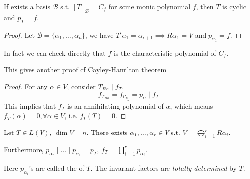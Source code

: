 \begin{proposition}
	If exists a basis $\mathcal{B}$ s.t. $[T]_{\mathcal{B}} = C_f$ for some
	monic polynomial $f$, then $T$ is cyclic and $p_T = f$.
\end{proposition}
\begin{proof}[Proof]
    Let $\mathcal{B} = \{\alpha_1,\dots,\alpha_n\}$,
	we have $T^i \alpha_1 = \alpha_{i + 1} \implies R\alpha_1 = V$ and
	$p_{\alpha_1} = f$.
\end{proof}

\begin{remark}
    In fact we can check directly that $f$ is the
	characteristic polynomial of $C_f$.

	This gives another proof of Cayley-Hamilton theorem: 
	\begin{proof}[Proof]
	    For any $\alpha\in V$, consider $T_{R\alpha} \mid f_T$.
		\[
		f_{T_{R\alpha}} = f_{C_{p_\alpha}} = p_\alpha \mid f_T
		\]
		This implies that $f_T$ is an annihilating polynomial of $\alpha$,
		which means $f_T(\alpha) = 0, \forall \alpha\in V$,
		i.e. $f_T(T) = 0$.
	\end{proof}
\end{remark}

\begin{theorem}
    Let $T\in L(V)$, $\dim V = n$. There exists $\alpha_1,\dots,\alpha_r\in V$
	s.t. $V = \bigoplus_{i=1}^r R\alpha_i$.

	Furthermore, $p_{\alpha_r}\mid\dots\mid p_{\alpha_1} = p_T$,
	$f_T = \prod_{i=1}^r p_{\alpha_i}$.

	Here $p_{\alpha_i}$'s are called the  of $T$.
	The invariant factors are \textit{totally determined} by $T$.
\end{theorem}
